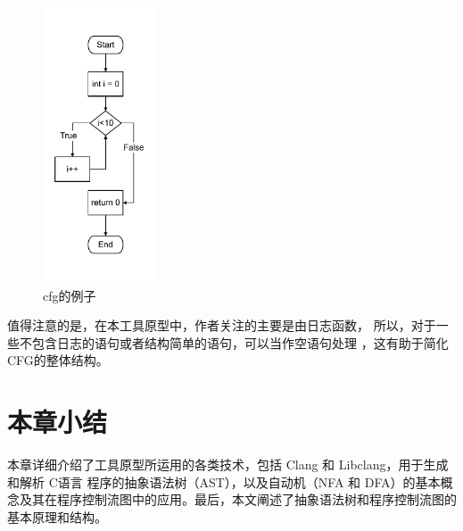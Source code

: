 \begin{figure}[htbp]
	\centering
	\includegraphics[width=0.3\textwidth]{pictures/cfg例子.pdf}
	\caption{cfg的例子}
	\label{fig:cfg的例子}
\end{figure}




值得注意的是，在本工具原型中，作者关注的主要是由日志函数，
所以，对于一些不包含日志的语句或者结构简单的语句，可以当作空语句处理
，这有助于简化CFG的整体结构。
\section{本章小结}
本章详细介绍了工具原型所运用的各类技术，包括 Clang 和 Libclang，用于生成和解析 C语言 程序的抽象语法树（AST），以及自动机（NFA 和 DFA）的基本概念及其在程序控制流图中的应用。最后，本文阐述了抽象语法树和程序控制流图的基本原理和结构。

